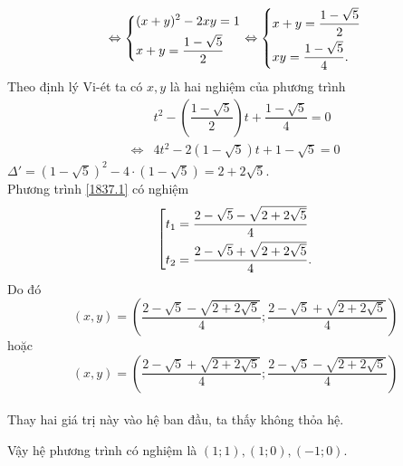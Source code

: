 \begin{ex}
{\begin{enumerate}[\bfseries TH1:]
\begin{itemize}
\[							\Leftrightarrow \left\{\begin{aligned}&(x+y)^2-2xy=1 \\&x+y=\dfrac{1-\sqrt{5}}{2}\end{aligned}\right.
							\Leftrightarrow   \left\{\begin{aligned}&x+y=\dfrac{1-\sqrt{5}}{2}\\& xy=\dfrac{1-\sqrt{5}}{4}.\end{aligned}\right.\]
							Theo định lý Vi-ét ta có $x,y$ là hai nghiệm của phương trình
							\begin{align*}
								&t^2-\left( \dfrac{1-\sqrt{5}}{2} \right)t + \dfrac{1-\sqrt{5}}{4}=0 \\
								\Leftrightarrow &4t^2-2(1-\sqrt{5})t+1-\sqrt{5}=0 \tag{3} \label{1837.1}
							\end{align*}
							$\Delta' =(1-\sqrt{5})^2-4 \cdot (1-\sqrt{5}) = 2+2\sqrt{5}.$\\
							Phương trình \eqref{1837.1} có nghiệm\\
							\[\left[\begin{aligned}&t_1=\dfrac{2-\sqrt{5}-\sqrt{2+2\sqrt{5}}}{4} \\ &t_2=\dfrac{2-\sqrt{5}+\sqrt{2+2\sqrt{5}}}{4}.\end{aligned}\right.\]
							Do đó \\
							$$(x,y)=\left(\dfrac{2-\sqrt{5}-\sqrt{2+2\sqrt{5}}}{4};\dfrac{2-\sqrt{5}+\sqrt{2+2\sqrt{5}}}{4}\right)$$
							hoặc\\
							$$(x,y)=\left(\dfrac{2-\sqrt{5}+\sqrt{2+2\sqrt{5}}}{4};\dfrac{2-\sqrt{5}-\sqrt{2+2\sqrt{5}}}{4}\right)$$\\
							Thay hai giá trị này vào hệ ban đầu, ta thấy không thỏa hệ. 
					\end{itemize}	 
		Vậy hệ phương trình có nghiệm là $(1;1),(1;0),(-1;0)$.
	\end{enumerate}
	}
\end{ex}

